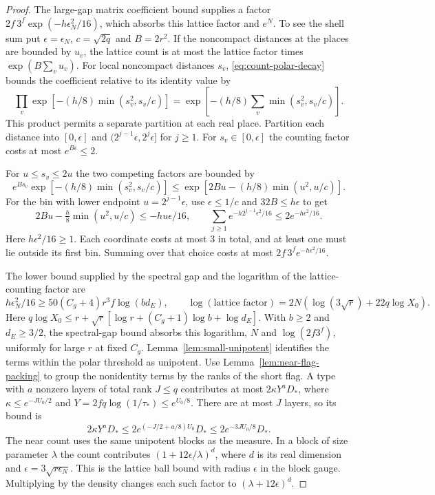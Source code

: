 \begin{proof}
The large-gap matrix coefficient bound supplies a factor
  \(2f\,3^f\exp(-h\epsilon_N^2/16)\), which absorbs this
  lattice factor and \(e^N\). To see the shell sum put
  \(\epsilon=\epsilon_N\), \(c=\sqrt{2q}\) and \(B=2r^2\).
  If the noncompact distances at the places are bounded
  by \(u_v\), the lattice count is at most the lattice
  factor times \(\exp(B\sum_v u_v)\).
  For local noncompact distances \(s_v\), \eqref{eq:count-polar-decay}
bounds the coefficient relative to its identity value by
\[
 \prod_v\exp[-(h/8)\min(s_v^2,s_v/c)]
       =\exp[-(h/8)\textstyle\sum_v\min(s_v^2,s_v/c)] .
\]
This product permits a separate partition at each real place.
  Partition each distance into \([0,\epsilon]\) and
  \((2^{j-1}\epsilon,2^j\epsilon]\) for \(j\ge1\).
  For \(s_v\in[0,\epsilon]\) the counting factor costs at most
\(e^{B\epsilon}\le2\).

For \(u\le s_v\le2u\) the two competing
factors are bounded by
\[
 e^{Bs_v}\exp[-(h/8)\min(s_v^2,s_v/c)]
 \le \exp[2Bu-(h/8)\min(u^2,u/c)] .
\] For the
  bin with lower endpoint \(u=2^{j-1}\epsilon\), use
  \(\epsilon\le1/c\) and \(32B\le h\epsilon\) to get
  \[
   2Bu-\tfrac h8\min(u^2,u/c)\le-hu\epsilon/16,\qquad
   \sum_{j\ge1}e^{-h2^{j-1}\epsilon^2/16}
                         \le2e^{-h\epsilon^2/16}.
  \]
  Here \(h\epsilon^2/16\ge1\). Each coordinate costs at most
  \(3\) in total, and at least one must lie outside its first bin.
  Summing over that choice costs at most
  \(2f\,3^f e^{-h\epsilon^2/16}\). 

The lower bound supplied by the spectral gap and the logarithm of the lattice-counting factor are
  \[
    h\epsilon_N^2/16\ge50(C_g+4)r^3 f\log(bd_E),\qquad
    \log(\text{lattice factor})=2N(\log(3\sqrt r)+22q\log X_0).
  \]
  Here \(q\log X_0\le r+\sqrt r[\log r+
  (C_g+1)\log b+\log d_E]\). With \(b\ge2\) and
  \(d_E\ge3/2\), the spectral-gap bound absorbs this logarithm,
  \(N\) and \(\log(2f3^f)\), uniformly for large \(r\)
  at fixed \(C_g\).
  Lemma~\ref{lem:small-unipotent} identifies the terms within the
  polar threshold as unipotent. Use Lemma~\ref{lem:near-flag-packing}
  to group the nonidentity terms by the ranks of the short flag. A type with \(a\) nonzero layers of
  total rank \(J\le q\) contributes at most
  \(2\kappa Y^a D_*\), where
  \(\kappa\le e^{-JU_0/2}\) and
  \(Y=2fq\log(1/\tau_*)\le e^{U_0/8}\).
  There are at most \(J\) layers, so its bound is
\[
 2\kappa Y^a D_*\le 2e^{(-J/2+a/8)U_0}D_*
              \le 2e^{-3JU_0/8}D_* .
\]
  The near count uses the same unipotent blocks as the
  measure. In a block of size parameter \(\lambda\) the count
  contributes \((1+12\epsilon/\lambda)^{d}\), where \(d\)
  is its real dimension and
  \(\epsilon=3\sqrt{r\epsilon_N}\). This is the lattice
  ball bound with radius \(\epsilon\) in the block gauge.
  Multiplying by the density changes each such factor to
  \((\lambda+12\epsilon)^d\).


\end{proof}
